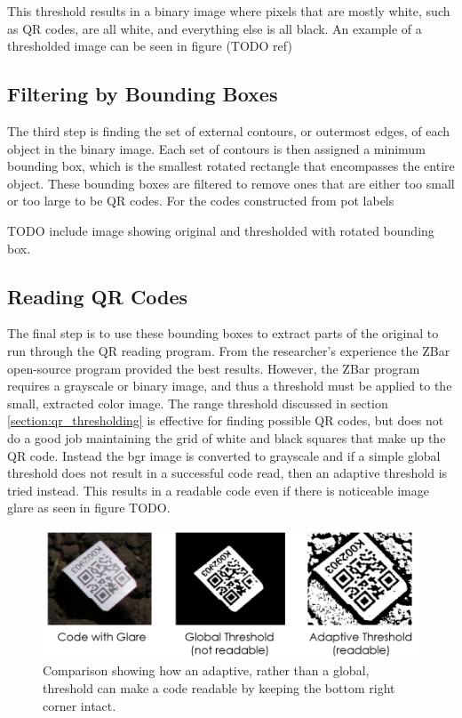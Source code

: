 This threshold results in a binary image where pixels that are mostly white, such as QR codes, are all white, and everything else is all black.  An example of a thresholded image can be seen in figure (TODO ref)

\subsection{Filtering by Bounding Boxes}

The third step is finding the set of external contours, or outermost edges, of each object in the binary image.  Each set of contours is then assigned a minimum bounding box, which is the smallest rotated rectangle that encompasses the entire object.  These bounding boxes are filtered to remove ones that are either too small or too large to be QR codes.  For the codes constructed from pot labels 

TODO include image showing original and thresholded with rotated bounding box. 

\subsection{Reading QR Codes}

The final step is to use these bounding boxes to extract parts of the original to run through the QR reading program.  From the researcher's experience the ZBar open-source program provided the best results.  However, the ZBar program requires a grayscale or binary image, and thus a threshold must be applied to the small, extracted color image.  The range threshold discussed in section \ref{section:qr_thresholding} is effective for finding possible QR codes, but does not do a good job maintaining the grid of white and black squares that make up the QR code.  Instead the \ac{bgr} image is converted to grayscale and if a simple global threshold does not result in a successful code read, then an adaptive threshold is tried instead.  This results in a readable code even if there is noticeable image glare as seen in figure TODO. 

\begin{figure}[htb]
	\centering
    \includegraphics[width=5.5in]{figures/adaptive_threshold.png}
    \caption[Adaptive threshold]{Comparison showing how an adaptive, rather than a global, threshold can make a code readable by keeping the bottom right corner intact.}
    \label{figure:adaptive_threshold}
\end{figure} 

